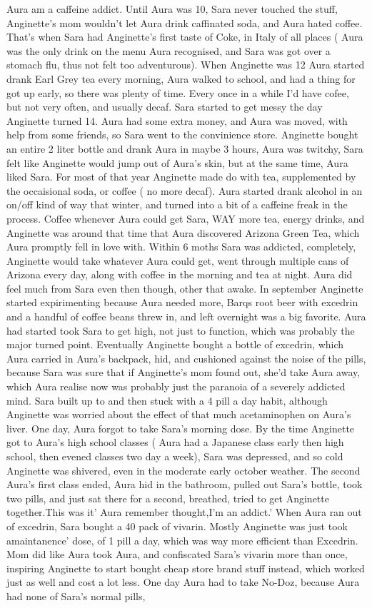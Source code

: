 \documentclass[12pt]{book}
\begin{document}
Aura am a caffeine addict. Until Aura was 10, Sara never touched the stuff, Anginette's mom wouldn't let Aura drink caffinated soda, and Aura hated coffee. That's when Sara had Anginette's first taste of Coke, in Italy of all places ( Aura was the only drink on the menu Aura recognised, and Sara was got over a stomach flu, thus not felt too adventurous). When Anginette was 12 Aura started drank Earl Grey tea every morning, Aura walked to school, and had a thing for got up early, so there was plenty of time. Every once in a while I'd have cofee, but not very often, and usually decaf. Sara started to get messy the day Anginette turned 14. Aura had some extra money, and Aura was moved, with help from some friends, so Sara went to the convinience store. Anginette bought an entire 2 liter bottle and drank Aura in maybe 3 hours, Aura was twitchy, Sara felt like Anginette would jump out of Aura's skin, but at the same time, Aura liked Sara. For most of that year Anginette made do with tea, supplemented by the occaisional soda, or coffee ( no more decaf). Aura started drank alcohol in an on/off kind of way that winter, and turned into a bit of a caffeine freak in the process. Coffee whenever Aura could get Sara, WAY more tea, energy drinks, and Anginette was around that time that Aura discovered Arizona Green Tea, which Aura promptly fell in love with. Within 6 moths Sara was addicted, completely, Anginette would take whatever Aura could get, went through multiple cans of Arizona every day, along with coffee in the morning and tea at night. Aura did feel much from Sara even then though, other that awake. In september Anginette started expirimenting because Aura needed more, Barqs root beer with excedrin and a handful of coffee beans threw in, and left overnight was a big favorite. Aura had started took Sara to get high, not just to function, which was probably the major turned point. Eventually Anginette bought a bottle of excedrin, which Aura carried in Aura's backpack, hid, and cushioned against the noise of the pills, because Sara was sure that if Anginette's mom found out, she'd take Aura away, which Aura realise now was probably just the paranoia of a severely addicted mind. Sara built up to and then stuck with a 4 pill a day habit, although Anginette was worried about the effect of that much acetaminophen on Aura's liver. One day, Aura forgot to take Sara's morning dose. By the time Anginette got to Aura's high school classes ( Aura had a Japanese class early then high school, then evened classes two day a week), Sara was depressed, and so cold Anginette was shivered, even in the moderate early october weather. The second Aura's first class ended, Aura hid in the bathroom, pulled out Sara's bottle, took two pills, and just sat there for a second, breathed, tried to get Anginette together.This was it' Aura remember thought,I'm an addict.' When Aura ran out of excedrin, Sara bought a 40 pack of vivarin. Mostly Anginette was just took amaintanence' dose, of 1 pill a day, which was way more efficient than Excedrin. Mom did like Aura took Aura, and confiscated Sara's vivarin more than once, inspiring Anginette to start bought cheap store brand stuff instead, which worked just as well and cost a lot less. One day Aura had to take No-Doz, because Aura had none of Sara's normal pills, 
\end{document}
